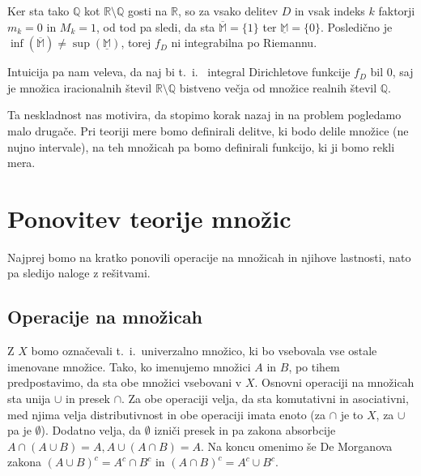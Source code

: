 \documentclass[a4paper, 10pt]{article}
\newcommand{\mth}[1]{\ensuremath{\mathbb{#1}}}
\newcommand{\R}{\mth{R}}
\begin{document}
	Ker sta tako $\mth{Q}$ kot $\R\setminus\mth{Q}$ gosti na $\R$, so za vsako delitev $D$ in vsak indeks $k$ faktorji $m_k = 0$ in $M_k = 1$, od tod pa sledi, da sta $\overline{\mth{M}} = \{1\}$ ter $\underline{\mth{M}} = \{0\}$. Posledično je $\inf(\overline{\mth{M}}) \neq \sup(\underline{\mth{M}})$, torej $f_D$ ni integrabilna po Riemannu.
	
	Intuicija pa nam veleva, da naj bi t.~i.~ integral Dirichletove funkcije $f_D$ bil $0$, saj je množica iracionalnih števil $\R\setminus\mth{Q}$ bistveno večja od množice realnih števil $\mth{Q}$.
	
	Ta neskladnost nas motivira, da stopimo korak nazaj in na problem pogledamo malo drugače. Pri teoriji mere bomo definirali delitve, ki bodo delile množice (ne nujno intervale), na teh množicah pa bomo definirali funkcijo, ki ji bomo rekli mera.
	\section{Ponovitev teorije množic}
	Najprej bomo na kratko ponovili operacije na množicah in njihove lastnosti, nato pa sledijo naloge z rešitvami.
	\subsection{Operacije na množicah}
	Z $X$ bomo označevali t.~i.~univerzalno množico, ki bo vsebovala vse ostale imenovane množice. Tako, ko imenujemo množici $A$ in $B$, po tihem predpostavimo, da sta obe množici vsebovani v $X$. Osnovni operaciji na množicah sta unija $\cup$ in presek $\cap$. Za obe operaciji velja, da sta komutativni in asociativni, med njima velja distributivnost in obe operaciji imata enoto (za $\cap$ je to $X$, za $\cup$ pa je $\emptyset$). Dodatno velja, da $\emptyset$ izniči presek in pa zakona absorbcije $A\cap(A\cup B) = A, A\cup(A\cap B) = A$. Na koncu omenimo še De Morganova zakona $(A\cup B)^c = A^c \cap B^c$ in $(A\cap B)^c = A^c \cup B^c$.
\end{document}
